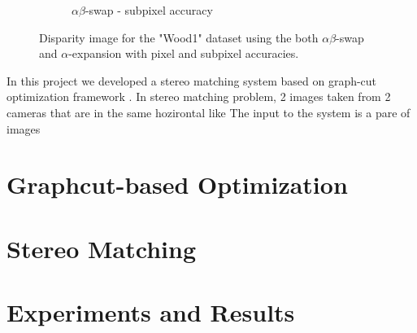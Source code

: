\documentclass[letterpaper, 10 pt, conference]{ieeeconf}  %
\begin{document}
\begin{figure}[t]
\begin{subfigure}[b]{0.3\textwidth}
                \caption{$\alpha\beta$-swap - subpixel accuracy}
                \label{fig:farm}
        \end{subfigure}
        \caption{Disparity image for the "Wood1" dataset using the both $\alpha\beta$-swap and $\alpha$-expansion with pixel and subpixel accuracies.}
        \label{fig:realmaps}
\end{figure}

In this project we developed a stereo matching system based on graph-cut optimization framework \cite{boykov2001fast}. In stereo matching problem, 2 images taken from 2 cameras that are in the same hozirontal like The input to the system is a pare of images 

\section{Graphcut-based Optimization}
\section{Stereo Matching}
\section{Experiments and Results}
 

\end{document}
